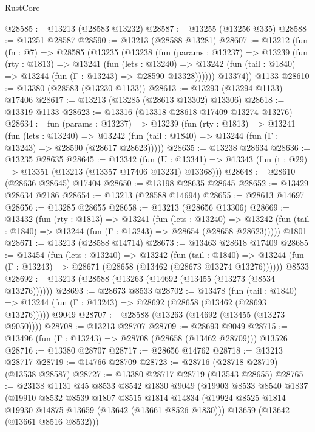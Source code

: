 \begin{lexlean}{RustCore}
\begin{coremodule}
@28585 := @13213 (@28583 @13232)
@28587 := @13255 (@13256 @335)
@28588 := @13251 @28587
@28590 := @13213 (@28588 @13281)
@28607 := @13212
    (fun (fn : @7) =>
    @28585
      (@13235
        (@13238
          (fun (params : @13237) =>
          @13239
            (fun (rty : @1813) =>
            @13241
              (fun (lets : @13240) =>
              @13242 (fun (tail : @1840) => @13244 (fun (Γ : @13243) => @28590 @13328))))))
        @13374))
    @1133
@28610 := @13380 (@28583 (@13230 @1133))
@28613 := @13293 (@13294 @1133) @17406
@28617 := @13213 (@13285 (@28613 @13302) @13306)
@28618 := @13319 @1133
@28623 := @13316 (@13318 @28618 @17409 @13274 @13276)
@28634 := fun (params : @13237) =>
  @13239
    (fun (rty : @1813) =>
    @13241
      (fun (lets : @13240) =>
      @13242 (fun (tail : @1840) => @13244 (fun (Γ : @13243) => @28590 (@28617 @28623)))))
@28635 := @13238 @28634
@28636 := @13235 @28635
@28645 := @13342
    (fun (U : @13341) => @13343 (fun (t : @29) => @13351 (@13213 (@13357 @17406 @13231) @13368)))
@28648 := @28610 (@28636 @28645) @17404
@28650 := @13198 @28635 @28645
@28652 := @13429 @28634 @2186
@28654 := @13213 (@28588 @14694)
@28655 := @28613 @14697
@28656 := @13285 @28655
@28658 := @13213 (@28656 @13306)
@28669 := @13432
    (fun (rty : @1813) =>
    @13241
      (fun (lets : @13240) =>
      @13242 (fun (tail : @1840) => @13244 (fun (Γ : @13243) => @28654 (@28658 @28623)))))
    @1801
@28671 := @13213 (@28588 @14714)
@28673 := @13463 @28618 @17409
@28685 := @13454
    (fun (lets : @13240) =>
    @13242
      (fun (tail : @1840) =>
      @13244 (fun (Γ : @13243) => @28671 (@28658 (@13462 (@28673 @13274 @13276))))))
    @8533
@28692 := @13213 (@28588 (@13263 (@14692 (@13455 (@13273 (@8534 @13276))))))
@28693 := @28673 @8533
@28702 := @13478
    (fun (tail : @1840) => @13244 (fun (Γ : @13243) => @28692 (@28658 (@13462 (@28693 @13276)))))
    @9049
@28707 := @28588 (@13263 (@14692 (@13455 (@13273 @9050))))
@28708 := @13213 @28707
@28709 := @28693 @9049
@28715 := @13496 (fun (Γ : @13243) => @28708 (@28658 (@13462 @28709))) @13526
@28716 := @13380 @28707
@28717 := @28656 @14762
@28718 := @13213 @28717
@28719 := @14766 @28709
@28723 := @28716 (@28718 @28719) (@13538 @28587)
@28727 := @13380 @28717 @28719 (@13543 @28655)
@28765 := @23138
    @1131
    @45
    @8533
    @8542
    @1830
    @9049
    (@19903
      @8533
      @8540
      @1837
      (@19910
        @8532
        @8539
        @1807
        @8515
        @1814
        @14834
        (@19924 @8525 @1814 @19930 @14875 @13659 (@13642 (@13661 @8526 @1830)))
        @13659
        (@13642 (@13661 @8516 @8532)))

\end{coremodule}
\end{lexlean}
